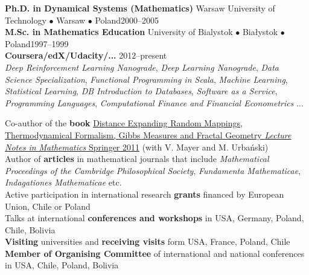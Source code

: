 \documentclass[a4paper, oneside]{scrreprt}
\begin{document}
\noindent\makebox[\linewidth]{\rule{\textwidth}{0.4pt}}

\vspace{0.1cm}

  
\noindent\textbf{Ph.D. in Dynamical Systems (Mathematics)} Warsaw University of Technology $\bullet$ Warsaw $\bullet$ Poland\hfill 2000--2005\\
\noindent\textbf{M.Sc. in Mathematics Education} University of Bialystok $\bullet$ Białystok $\bullet$ Poland\hfill 1997--1999\\
\noindent\textbf{Coursera/edX/Udacity/...} \hfill 2012--present\\
\emph{Deep Reinforcement Learning Nanograde}, 
\emph{Deep Learning Nanograde}, \emph{Data Science Specialization}, \emph{Functional Programming in Scala}, 
\emph{Machine Learning},  \emph{Statistical Learning}, 
\emph{DB Introduction to Databases}, \emph{Software as a Service}, 
\emph{Programming Languages}, 
\emph{Computational Finance and Financial Econometrics} ... \\
\noindent\makebox[\linewidth]{\rule{\textwidth}{0.4pt}}

\vspace{0.1cm}


\noindent\llap{\FA \faBook\ \ }Co-author of the \textbf{book} \href{http://www.amazon.com/Distance-Expanding-Thermodynamical-Formalism-Mathematics/dp/3642236499/ref=sr_1_1?s=books&ie=UTF8&qid=1410309067&sr=1-1}{Distance Expanding Random Mappings, Thermodynamical Formalism, Gibbs Measures and Fractal Geometry \textit{Lecture Notes in Mathematics} Springer 2011} (with V. Mayer and M. Urbański)\\
\noindent\llap{\FA \faPencil\ \ }Author of \textbf{articles} in 
mathematical journals that include  
\textit{Mathematical Proceedings of the Cambridge Philosophical Society}, \textit{Fundamenta Mathematicae}, \textit{Indagationes Mathematicae} etc.\\
\noindent\llap{\FA \faFlask\ \ }Active participation in international research \textbf{grants} financed by European Union, Chile or Poland\\
\noindent\llap{\FA \faBullhorn\ \ }Talks at international 
\textbf{conferences and workshops} in USA, Germany, Poland, 
Chile, Bolivia\\
\noindent\llap{\FA \faExchange\ \ }\textbf{Visiting} 
universities and \textbf{receiving visits} form USA, France, Poland, Chile\\
\noindent\llap{\FA \faCalendar\ \ }\textbf{Member of Organising Committee}
of international and national conferences in USA, Chile, Poland, Bolivia
\end{document}

